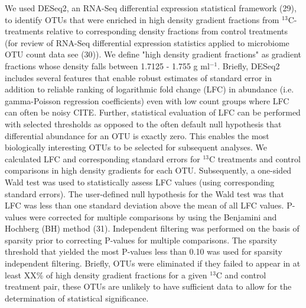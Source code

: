We used DESeq2, an RNA-Seq differential expression statistical framework (29),
to identify OTUs that were enriched in high density gradient fractions from
$^{13}$C-treatments relative to corresponding density fractions from control
treatments (for review of RNA-Seq differential expression statistics applied to
microbiome OTU count data see (30)). We define "high density gradient
fractions" as gradient fractions whose density falls between
1.7125 - 1.755 g ml$^{-1}$. Briefly, DESeq2 includes several features that enable
robust estimates of standard error in addition to reliable ranking of
logarithmic fold change (LFC) in abundance (i.e. gamma-Poisson regression
coefficients) even with low count groups where LFC can often be noisy CITE.
Further, statistical evaluation of LFC can be performed with selected
thresholds as opposed to the often default null hypothesis that differential
abundance for an OTU is exactly zero. This enables the most biologically
interesting OTUs to be selected for subsequent analyses. We calculated LFC and
corresponding standard errors for $^{13}$C treatments and control comparisons
in high density gradients for each OTU. Subsequently, a one-sided Wald test was
used to statistically assess LFC values (using corresponding standard errors).
The user-defined null hypothesis for the Wald test was that LFC was less than
one standard deviation above the mean of all LFC values. P-values were
corrected for multiple comparisons by using the Benjamini and Hochberg (BH)
method (31). Independent filtering was performed on the basis of sparsity prior
to correcting P-values for multiple comparisons. The sparsity threshold that
yielded the most P-values less than 0.10 was used for sparsity independent
filtering. Briefly, OTUs were eliminated if they failed to appear in at least
XX\% of high density gradient fractions for a given $^{13}$C and control
treatment pair, these OTUs are unlikely to have sufficient data to allow for
the determination of statistical significance.
